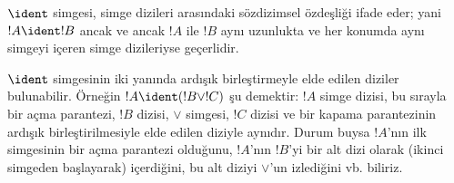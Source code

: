 \documentclass[../../../include/open-logic-section]{subfiles}
\begin{document}
\begin{defn}
$\ident$ simgesi, simge dizileri arasındaki sözdizimsel özdeşliği ifade
eder; yani $!A \ident !B$ ancak ve ancak $!A$ ile $!B$ aynı uzunlukta ve her
konumda aynı simgeyi içeren simge dizileriyse geçerlidir.
\end{defn}

$\ident$ simgesinin iki yanında ardışık birleştirmeyle elde edilen diziler
bulunabilir. Örneğin $!A \ident (!B \lor !C)$ şu demektir: $!A$ simge dizisi,
bu sırayla bir açma parantezi, $!B$ dizisi, $\lor$ simgesi, $!C$ dizisi ve
bir kapama parantezinin ardışık birleştirilmesiyle elde edilen diziyle
aynıdır. Durum buysa $!A$'nın ilk simgesinin bir açma parantezi olduğunu,
$!A$'nın $!B$'yi bir alt dizi olarak (ikinci simgeden başlayarak) içerdiğini,
bu alt diziyi $\lor$'un izlediğini vb. biliriz.
\end{document}
